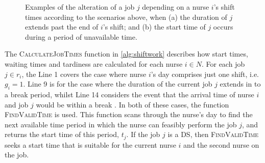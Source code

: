 \documentclass[a4paper,11pt,authoryear]{elsarticle}
\begin{document}
\begin{figure}[h!]
	\centering	
	\begin{subfigure}[h]{\textwidth}
		\centering
		
		\vspace{-2mm}\caption{}
		\label{fig:itemsinfeas}
		\vspace{2mm}
	\end{subfigure}
	\begin{subfigure}[h]{\textwidth}
		\centering
		
		\vspace{-2mm}\caption{}
		\label{fig:itemsfeas}
	\end{subfigure}
	\caption{Examples of the alteration of a job $j$ depending on a nurse $i$'s shift times according to the scenarios above, when (a) the duration of $j$ extends past the end of $i$'s shift; and (b) the start time of $j$ occurs during a period of unavailable time.}
	\label{fig:itemsaligned}
\end{figure}
\noindent The \textsc{CalculateJobTimes} function in \ref{alg:shiftwork} describes how start times, waiting times and tardiness are calculated for each nurse $i \in N$. For each job $j \in r_i$, the  Line 1 covers the case where nurse $i$'s day comprises just one shift, i.e. $g_i = 1$. Line 9 is for the case where the duration of the current job $j$ extends in to a break period, whilst Line 14 considers the event that the arrival time of nurse $i$ and job $j$ would be within a break . In both of these cases, the function \textsc{FindValidTime} is used. This function scans through the nurse's day to find the next available time period in which the nurse can feasibly perform the job $j$, and returns the start time of this period, $t_j$. If the job $j$ is a DS, then \textsc{FindValidTime} seeks a start time that is suitable for the current nurse $i$ and the second nurse on the job.
\end{document}
